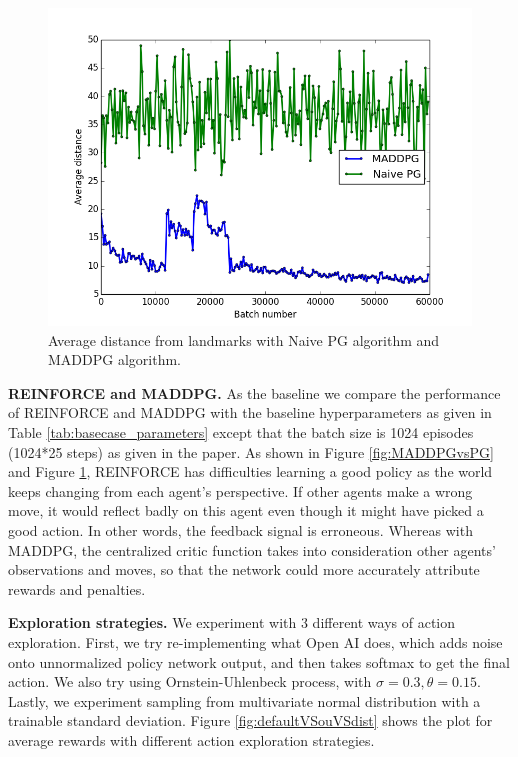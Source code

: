 \documentclass{article}
\begin{document}
\begin{figure}
\begin{center}
\includegraphics[scale=0.4]{MADDPGvsPG_distance}
\end{center}
\caption{Average distance from landmarks with Naive PG algorithm and MADDPG algorithm.}
\label{fig:MADDPGvsPG_distance}
\end{figure}

\textbf{REINFORCE and MADDPG.} As the baseline we compare the performance of REINFORCE and MADDPG with the baseline hyperparameters as given in Table \ref{tab:basecase_parameters} except that the batch size is 1024 episodes (1024*25 steps) as given in the \cite{maddpg} paper. As shown in Figure \ref{fig:MADDPGvsPG} and Figure \ref{fig:MADDPGvsPG_distance}, REINFORCE has difficulties learning a good policy as the world keeps changing from each agent's perspective. If other agents make a wrong move, it would reflect badly on this agent even though it might have picked a good action. In other words, the feedback signal is erroneous. Whereas with MADDPG, the centralized critic function takes into consideration other agents' observations and moves, so that the network could more accurately attribute rewards and penalties.  

\textbf{Exploration strategies.} We experiment with 3 different ways of action exploration. First, we try re-implementing what Open AI does, which adds noise onto unnormalized policy network output, and then takes softmax to get the final action. We also try using Ornstein-Uhlenbeck process, with $\sigma = 0.3, \theta = 0.15$. Lastly, we experiment sampling from multivariate normal distribution with a trainable standard deviation. Figure \ref{fig:defaultVSouVSdist} shows the plot for average rewards with different action exploration strategies.
\end{document}
